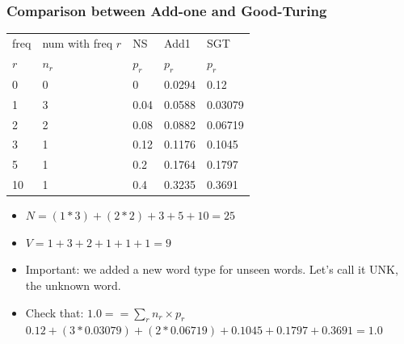 \begin{frame}
\frametitle{Comparison between Add-one and Good-Turing}
\centering
\begin{tabular}{lllll}
\hline
freq & num with freq $r$ & NS    & Add1  & SGT   \\
$r$  & $n_r$ & $p_r$ & $p_r$ & $p_r$ \\
\hline
0  &  0 & 0    & 0.0294 & 0.12 \\
1  &  3 & 0.04 & 0.0588 & 0.03079 \\
2  &  2 & 0.08 & 0.0882 & 0.06719 \\
3  &  1 & 0.12 & 0.1176 & 0.1045 \\
5  &  1 & 0.2  & 0.1764 & 0.1797 \\
10 &  1 & 0.4  & 0.3235 & 0.3691 \\
\hline
\end{tabular}
\begin{itemize}[<+->]
\item $N = (1*3) + (2*2) + 3 + 5 + 10 = 25$
\item $V = 1 + 3 + 2 + 1 + 1 + 1 = 9$
\item Important: we added a new word type for unseen words. Let's call it UNK, the unknown word.
\item Check that: $1.0 == \sum_r n_r \times p_r$ \\
{\small $0.12 + (3 * 0.03079) + (2 * 0.06719) + 0.1045  + 0.1797 + 0.3691 = 1.0$ }
\end{itemize}
\end{frame}

